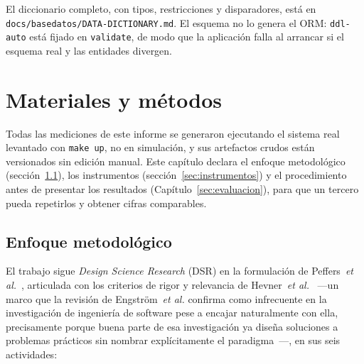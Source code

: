 \documentclass[11pt,a4paper]{article}
\newcommand{\ruta}[1]{\texttt{\footnotesize #1}}
\begin{document}
El diccionario completo, con tipos, restricciones y disparadores, está en
\ruta{docs/basedatos/DATA-DICTIONARY.md}. El esquema no lo genera el ORM:
\texttt{ddl-auto} está fijado en \texttt{validate}, de modo que la aplicación
falla al arrancar si el esquema real y las entidades divergen.

\section{Materiales y métodos}
\label{sec:protocolo}

Todas las mediciones de este informe se generaron ejecutando el sistema real
levantado con \texttt{make up}, no en simulación, y sus artefactos crudos
están versionados sin edición manual. Este capítulo declara el enfoque
metodológico (sección~\ref{sec:dsr}), los instrumentos
(sección~\ref{sec:instrumentos}) y el procedimiento antes de presentar los
resultados (Capítulo~\ref{sec:evaluacion}), para que un tercero pueda
repetirlos y obtener cifras comparables.

\subsection{Enfoque metodológico}
\label{sec:dsr}

El trabajo sigue \emph{Design Science Research} (DSR) en la formulación de
Peffers~\emph{et al.}~\cite{peffers2007}, articulada con los criterios de
rigor y relevancia de Hevner~\emph{et al.}~\cite{hevner2004} —un marco que
la revisión de Engström~\emph{et al.} confirma como infrecuente en la
investigación de ingeniería de software pese a encajar naturalmente con
ella, precisamente porque buena parte de esa investigación ya diseña
soluciones a problemas prácticos sin nombrar explícitamente el
paradigma~\cite{engstrom2020dsr}—, en sus seis
actividades:
\end{document}
